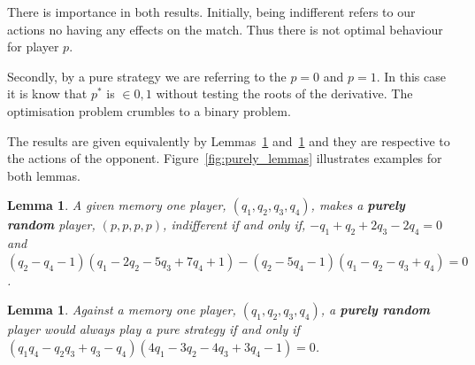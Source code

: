 \documentclass[10pt]{article}
\newtheorem{lemma}[theorem]{Lemma}
\begin{document}
There is importance in both results. Initially, being indifferent refers to our
actions no having any effects on the match. Thus there is not optimal behaviour
for player \(p\).

Secondly, by a pure strategy we are referring to the \(p=0\) and \(p=1\).
In this case it is know that \(p^*\) is \(\in {0, 1}\) without testing the roots
of the derivative. The optimisation problem crumbles to a binary problem.

The results are given equivalently by Lemmas~\ref{lemma:constant} and~\ref{lemma:linear}
and they are respective to the actions of the opponent. Figure~\ref{fig:purely_lemmas}
illustrates examples for both lemmas.

\begin{lemma}\label{lemma:constant}
    A given memory one player, \((q_1, q_2, q_3, q_4)\), makes a \textbf{purely
    random} player, \((p, p, p, p)\), indifferent if and only if, 
    \(-q_1 + q_2 + 2q_3 - 2q_4 = 0 \) and 
    \((q_2 - q_4 - 1)(q_1 - 2q_2 - 5q_3 + 7q_4 + 1) -(q_2 - 5q_4 - 1)(q_1 - q_2 - q_3 + q_4) = 0 \).
\end{lemma}

\begin{lemma}\label{lemma:linear}
    Against a memory one player, \((q_1, q_2, q_3, q_4)\), a \textbf{purely random}
    player would always play a pure strategy if and only if
    \((q_{1}q_{4} - q_{2} q_{3} + q_{3} - q_{4}) (4 q_{1} - 3 q_{2} - 4 q_{3} + 3 
    q_{4} - 1) = 0\).
\end{lemma}
\end{document}
